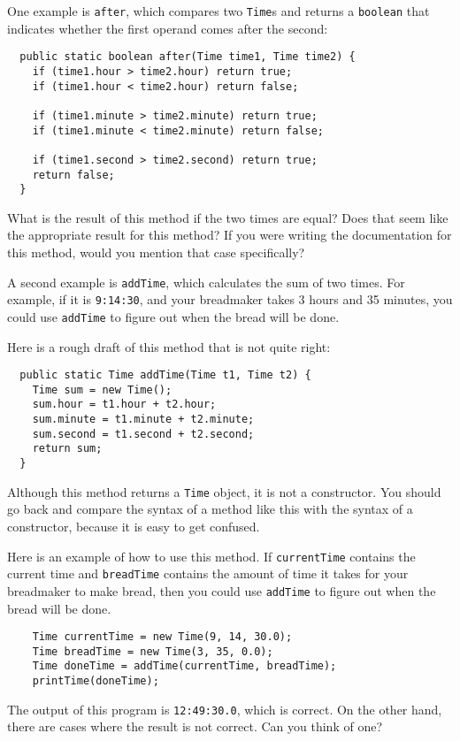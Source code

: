 \documentclass{book}
\begin{document}
One example is {\tt after}, which compares two {\tt Time}s and
returns a {\tt boolean} that indicates whether the first operand
comes after the second:

\begin{verbatim}
  public static boolean after(Time time1, Time time2) {
    if (time1.hour > time2.hour) return true;
    if (time1.hour < time2.hour) return false;

    if (time1.minute > time2.minute) return true;
    if (time1.minute < time2.minute) return false;

    if (time1.second > time2.second) return true;
    return false;
  }
\end{verbatim}
%
What is the result of this method if the two times are equal?  Does
that seem like the appropriate result for this method?  If you were
writing the documentation for this method, would you mention that case
specifically?

A second example is {\tt addTime}, which calculates the sum of two
times.  For example, if it is {\tt 9:14:30}, and your breadmaker takes
3 hours and 35 minutes, you could use {\tt addTime} to figure out when
the bread will be done.

Here is a rough draft of this method that is not quite right:

\begin{verbatim}
  public static Time addTime(Time t1, Time t2) {
    Time sum = new Time();
    sum.hour = t1.hour + t2.hour;
    sum.minute = t1.minute + t2.minute;
    sum.second = t1.second + t2.second;
    return sum;
  }
\end{verbatim}
%
Although this method returns a {\tt Time} object, it is not
a constructor.  You should go back and compare the syntax of
a method like this with the syntax of a constructor, because
it is easy to get confused.

Here is an example of how to use this method.  If {\tt currentTime}
contains the current time and {\tt breadTime} contains the amount
of time it takes for your breadmaker to make bread, then you
could use {\tt addTime} to figure out when the bread will be
done.

\begin{verbatim}
    Time currentTime = new Time(9, 14, 30.0);
    Time breadTime = new Time(3, 35, 0.0);
    Time doneTime = addTime(currentTime, breadTime);
    printTime(doneTime);
\end{verbatim}
%
The output of this program is {\tt 12:49:30.0}, which is
correct.  On the other hand, there are cases where the result
is not correct.  Can you think of one?
\end{document}
